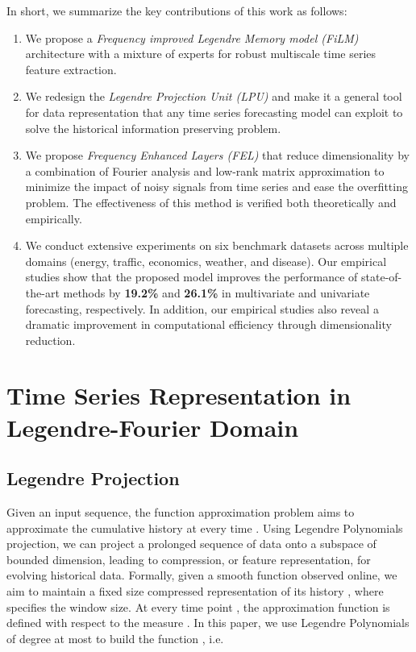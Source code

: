 \documentclass{article}
\begin{document}
In short, we summarize the key contributions of this work as follows:
\begin{enumerate}
    \item We propose a {\it Frequency improved Legendre Memory model (FiLM)} architecture with a mixture of experts for robust multiscale time series feature extraction.
    \item We redesign the {\it Legendre Projection Unit (LPU)} and make it a general tool for data representation that any time series forecasting model can exploit to solve the historical information preserving problem.
    \item We propose {\it Frequency Enhanced Layers (FEL)} that reduce dimensionality by a combination of Fourier analysis and low-rank matrix approximation to minimize the impact of noisy signals from time series and ease the overfitting problem. The effectiveness of this method is verified both theoretically and empirically.
    \item We conduct extensive experiments on six benchmark datasets across multiple domains (energy, traffic, economics, weather, and disease). Our empirical studies show that the proposed model improves the performance of state-of-the-art methods by \textbf{19.2\%} and \textbf{26.1\%} in multivariate and univariate forecasting, respectively. In addition, our empirical studies also reveal a dramatic improvement in computational efficiency through dimensionality reduction. 
\end{enumerate} 






\section{Time Series Representation in Legendre-Fourier Domain} \label{sec:theoretical}



\subsection{Legendre Projection}
 Given an input sequence, the function approximation problem aims to approximate the cumulative history at every time . Using Legendre Polynomials projection, we can project a prolonged sequence of data onto a subspace of bounded dimension, leading to compression, or feature representation, for evolving historical data. Formally, given a smooth function  observed online, we aim to maintain a fixed size compressed representation of its history , where  specifies the window size. At every time point , the approximation function  is defined with respect to the measure . In this paper, we use Legendre Polynomials of degree at most  to build the function , i.e.
  
\end{document}
